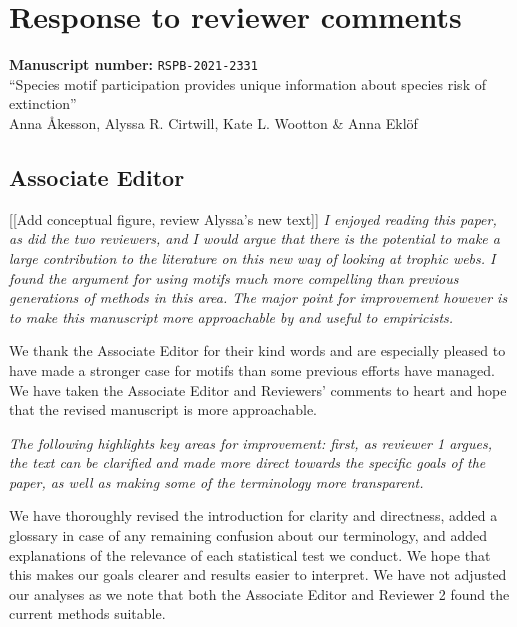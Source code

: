 \documentclass[12pt]{article}
\newcommand{\us}{\rm \setlength{\leftskip}{0.3cm} \setlength{\rightskip}{0.3cm}}
\newcommand{\them}{\it \setlength{\leftskip}{0cm} \setlength{\rightskip}{0cm}}
\begin{document}
 

\section*{Response to reviewer comments}

\begin{flushleft}
\textbf{Manuscript number: } \texttt{RSPB-2021-2331} \\
``Species motif participation provides unique information about species risk of extinction''\\
Anna {\AA}kesson, Alyssa R. Cirtwill, Kate L. Wootton \& Anna Ekl\"of
\end{flushleft}




\subsection*{Associate Editor} [[Add conceptual figure, review Alyssa's new text]]
    \them
    I enjoyed reading this paper, as did the two reviewers, and I would argue that there is the potential to make a large contribution to the literature on this new way of looking at trophic webs. I found the argument for using motifs much more compelling than previous generations of methods in this area. The major point for improvement however is to make this manuscript more approachable by and useful to empiricists.  
    
    \us
    We thank the Associate Editor for their kind words and are especially pleased to have made a stronger case for motifs than some previous efforts have managed. We have taken the Associate Editor and Reviewers' comments to heart and hope that the revised manuscript is more approachable.
    
    \them 
    The following highlights key areas for improvement: first, as reviewer 1 argues, the text can be clarified and made more direct towards the specific goals of the paper, as well as making some of the terminology more transparent.  
    
    \us
    We have thoroughly revised the introduction for clarity and directness, added a glossary in case of any remaining confusion about our terminology, and added explanations of the relevance of each statistical test we conduct. We hope that this makes our goals clearer and results easier to interpret. We have not adjusted our analyses as we note that both the Associate Editor and Reviewer 2 found the current methods suitable.
    
\end{document}
